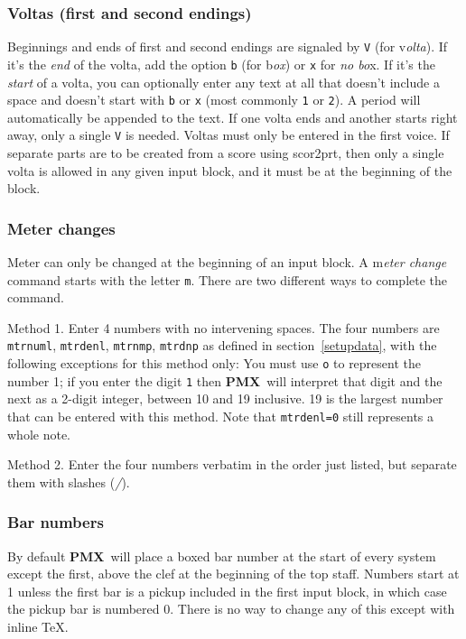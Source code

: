 \documentclass[11pt]{article}
\newcommand\PMXX{\textbf{PMX}}
\newcommand\PMX{\PMXX~}
\def\newfrom{2.59}  %
\def\NEW#1{\ifdim#1 pt<\newfrom pt\else%
\marginpar{\fbox{#1}}\fi}
\begin{document}
\subsubsection{Voltas (first and second endings)}

	Beginnings and ends of first and second endings are signaled by 
{\tt V} (for {\bfi v}{\it olta}).  
If it's the {\it end} of the volta, add the option {\tt b} (for 
{\bfi b}{\it ox}) or {\tt x} for {\it no bo}{\bfi x}.  
If it's the {\it start} of a volta, you can 
optionally enter any text at all that doesn't include a space and doesn't 
start with {\tt b} or {\tt x} (most 
commonly {\tt 1} or {\tt 2}).  A period will automatically be 
appended to the text.  If one volta ends and another starts right 
away, only a single {\tt V} is needed.  Voltas must only be entered in the 
first voice.  If separate parts are to be created from a score using 
{\bfx scor2prt}, then only a single volta is allowed in any given input 
block, and it must be at the beginning of the block.

\subsubsection{Meter changes}\label{MeterChange}

     Meter can only be changed at the beginning of an input block.  
A {\bfi m}{\it eter change} command starts with the letter {\tt m}.
There are two different ways to complete the command.

{\bfx Method 1.}  Enter 4 numbers 
with no intervening spaces.  The four numbers are {\tt mtrnuml}, 
{\tt mtrdenl}, {\tt mtrnmp}, {\tt mtrdnp} as defined in section~\ref{setupdata},
with the following exceptions for this method only:     
You must use {\tt o} to represent 
the number 1; if you enter the digit {\tt 1} then \PMX will interpret that 
digit and the next as a 2-digit integer, between 10 and 19 inclusive.
19 is the largest number that can be entered with this method. Note that 
{\tt mtrdenl=0} still represents a whole note.

{\bfx Method 2.}  \NEW{1.4} Enter the four numbers verbatim in the order just 
listed, but separate them with slashes ({\it /}).

\subsubsection{Bar numbers}

	By default \PMX will place a boxed bar number at the start of every system
except the first, above the clef at the beginning of the top staff. Numbers start at 
1 unless the first bar is a pickup included in the first input block, in which case
the pickup bar is numbered 0. There is no way to change any of this except with 
inline \TeX. 
\end{document}
